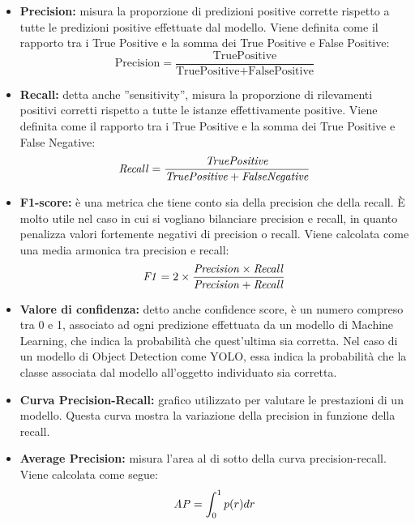 \documentclass[12pt]{article}
\begin{document}
\begin{itemize}
    \item \textbf{Precision:} misura la proporzione di predizioni positive corrette rispetto a tutte le predizioni positive effettuate dal modello. Viene definita come il rapporto tra i True Positive e la somma dei True Positive e False Positive:
    $$ \text{Precision} = \frac{\text{TruePositive}}{\text{TruePositive} + \text{FalsePositive}} $$

    \item \textbf{Recall:} detta anche ”sensitivity”, misura la proporzione di rilevamenti positivi corretti rispetto a tutte le istanze effettivamente positive. Viene definita come il rapporto tra i True Positive e la somma dei True Positive e False Negative:
    $$ \text{\textit{Recall}} = \frac{\text{\textit{TruePositive}}}{\text{\textit{TruePositive}} + \text{\textit{FalseNegative}}} $$

    \item \textbf{F1-score:} è una metrica che tiene conto sia della precision che della recall. È molto utile nel caso in cui si vogliano bilanciare precision e recall, in quanto penalizza valori fortemente negativi di precision o recall. Viene calcolata come una media armonica tra precision e recall:
    $$ \text{\textit{F1}} = 2 \times \frac{\text{\textit{Precision}} \times \text{\textit{Recall}}}{\text{\textit{Precision}} + \text{\textit{Recall}}} $$

    \item \textbf{Valore di confidenza:} detto anche confidence score, è un numero compreso tra 0 e 1, associato ad ogni predizione effettuata da un modello di Machine Learning, che indica la probabilità che quest’ultima sia corretta.
    Nel caso di un modello di Object Detection come YOLO, essa indica la probabilità che la classe associata dal modello all’oggetto individuato sia corretta.

    \item \textbf{Curva Precision-Recall:} grafico utilizzato per valutare le prestazioni di un modello. Questa curva mostra la variazione della precision in funzione della recall.

    \item \textbf{Average Precision:} misura l’area al di sotto della curva precision-recall. Viene calcolata come segue:
    $$ \text{\textit{AP}} = \int_0^1 p(r)dr $$


\end{itemize}
\end{document}
